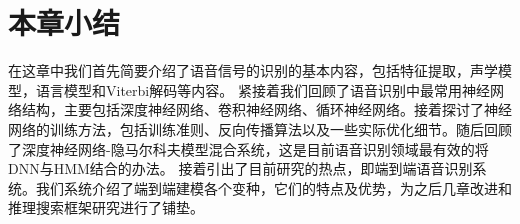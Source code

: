 \section{本章小结}
\label{chap:intro-sum}

在这章中我们首先简要介绍了语音信号的识别的基本内容，包括特征提取，声学模型，语言模型和Viterbi解码等内容。
%
紧接着我们回顾了语音识别中最常用神经网络结构，主要包括深度神经网络、卷积神经网络、循环神经网络。接着探讨了神经网络的训练方法，包括训练准则、反向传播算法以及一些实际优化细节。随后回顾了深度神经网络-隐马尔科夫模型混合系统，这是目前语音识别领域最有效的将DNN与HMM结合的办法。
接着引出了目前研究的热点，即端到端语音识别系统。我们系统介绍了端到端建模各个变种，它们的特点及优势，为之后几章改进和推理搜索框架研究进行了铺垫。